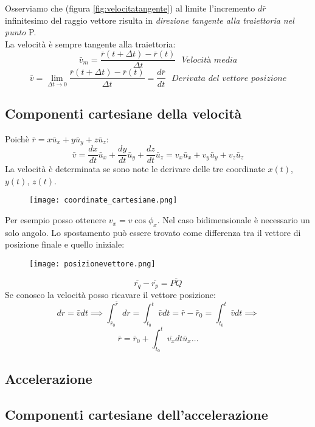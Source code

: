 \documentclass[../../main.tex]{subfiles}
\begin{document}
Osserviamo che (figura \ref{fig:velocitatangente}) al limite l'incremento $d\bar{r}$ infinitesimo del raggio vettore risulta in \textit{direzione tangente alla traiettoria nel punto} P.\\
La velocità è sempre tangente alla traiettoria:
\[
    \bar{v}_m = \dfrac{\bar{r}(t + \Delta t) - \bar{r}(t)}{\Delta t} \ \ \ \textit{Velocità media}
\]
\[
    \bar{v} = \lim_{\Delta t \to 0} \dfrac{\bar{r}(t + \Delta t) - \bar{r}(t)}{\Delta t} = \dfrac{d\bar{r}}{dt} \ \ \ \textit{Derivata del vettore posizione}
\]
\subsection{Componenti cartesiane della velocità}
Poichè $\bar r = x\bar{u}_x + y\bar{u}_y + z\bar{u}_z$:
\[
    \bar{v} = \dfrac{dx}{dt} \bar{u}_x + \dfrac{dy}{dt} \bar{u}_y + \dfrac{dz}{dt} \bar{u}_z = v_x\bar{u}_x + v_y\bar{u}_y + v_z\bar{u}_z
\]
La velocità è determinata se sono note le derivare delle tre coordinate $x(t)$, $y(t)$, $z(t)$.
\begin{figure}[H]
    \centering
    \texttt{[image: coordinate\_cartesiane.png]}
\end{figure}
Per esempio posso ottenere $v_x = v\cos\phi_x$. Nel caso bidimensionale è necessario un solo angolo.
Lo spostamento può essere trovato come differenza tra il vettore di posizione finale e quello iniziale:
\begin{figure}[H]
    \centering
    \texttt{[image: posizionevettore.png]}
\end{figure}
\[
    \overline{r_q} - \overline{r_p} = \overline{PQ}
\]
Se conosco la velocità posso ricavare il vettore posizione:
\[
    dr = \bar{v}dt \implies \int_{\bar{r}_0}^{\bar{r}} dr = \int_{t_0}^{t} \bar{v}dt = \bar{r} - \bar{r}_0 = \int_{t_0}^{t} \bar{v}dt \implies
\]
\[
    \bar{r} = \bar{r}_0 + \int_{t_0}^{t} \bar{v_x}dt\bar{u}_x \ldots
\]
\subsection{Accelerazione}


\subsection{Componenti cartesiane dell'accelerazione}
\end{document}
